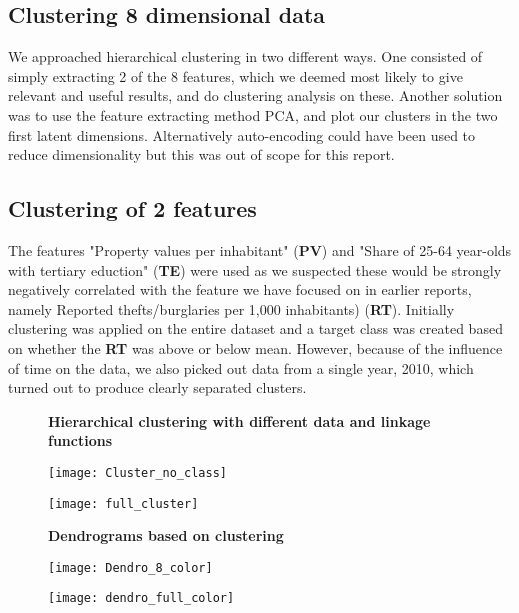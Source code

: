 \subsection{Clustering 8 dimensional data}
We approached hierarchical clustering in two different ways. One consisted of simply extracting 2 of the 8 features, which we deemed most likely to give relevant and useful results, and do clustering analysis on these. Another solution was to use the feature extracting method PCA, and plot our clusters in the two first latent dimensions. Alternatively auto-encoding could have been used to reduce dimensionality but this was out of scope for this report.
\subsection{Clustering of 2 features}
The features "Property values per inhabitant" (\textbf{PV}) and "Share of 25-64 year-olds with tertiary eduction" (\textbf{TE}) were used as we suspected these would be strongly negatively correlated with the feature we have focused on in earlier reports, namely Reported thefts/burglaries per 1,000 inhabitants) (\textbf{RT}). Initially clustering was applied on the entire dataset and a target class was created based on whether the \textbf{RT} was above or below mean. However, because of the influence of time on the data, we also picked out data from a single year, 2010, which turned out to produce clearly separated clusters.
\begin{figure}[H]
	\centering
	\textbf{Hierarchical clustering with different data and linkage functions}\par\medskip
	\begin{minipage}{.5\textwidth}
		\centering
		\texttt{[image: Cluster\_no\_class]}
		\label{fig:test1}
	\end{minipage}%
	\begin{minipage}{.5\textwidth}
		\centering
		\texttt{[image: full\_cluster]}
		\label{fig:test2}
	\end{minipage}
\end{figure}
\begin{figure}[H]
	\centering
	\textbf{Dendrograms based on clustering}\par\medskip
	\begin{minipage}{.5\textwidth}
		\centering
		\texttt{[image: Dendro\_8\_color]}
		\label{fig:test1}
	\end{minipage}%
	\begin{minipage}{.5\textwidth}
		\centering
		\texttt{[image: dendro\_full\_color]}
		\label{fig:test2}
	\end{minipage}
\end{figure}
